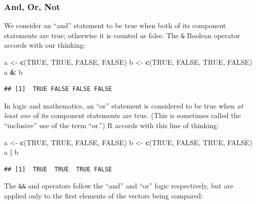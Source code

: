 \documentclass[]{book}
\makeatletter
\newenvironment{Shaded}{\begin{snugshade}}{\end{snugshade}}
\newcommand{\KeywordTok}[1]{\textcolor[rgb]{0.13,0.29,0.53}{\textbf{#1}}}
\newcommand{\StringTok}[1]{\textcolor[rgb]{0.31,0.60,0.02}{#1}}
\newcommand{\OtherTok}[1]{\textcolor[rgb]{0.56,0.35,0.01}{#1}}
\newcommand{\OperatorTok}[1]{\textcolor[rgb]{0.81,0.36,0.00}{\textbf{#1}}}
\newcommand{\NormalTok}[1]{#1}
\newenvironment{kframe}{%
\medskip{}
\setlength{\fboxsep}{.8em}
 \def\at@end@of@kframe{}%
 \ifinner\ifhmode%
  \def\at@end@of@kframe{\end{minipage}}%
  \begin{minipage}{\columnwidth}%
 \fi\fi%
 \def\FrameCommand##1{\hskip\@totalleftmargin \hskip-\fboxsep
 \colorbox{shadecolor}{##1}\hskip-\fboxsep
     \hskip-\linewidth \hskip-\@totalleftmargin \hskip\columnwidth}%
 \MakeFramed {\advance\hsize-\width
   \@totalleftmargin\z@ \linewidth\hsize
   \@setminipage}}%
 {\par\unskip\endMakeFramed%
 \at@end@of@kframe}
\renewenvironment{Shaded}{\begin{kframe}}{\end{kframe}}
\theoremstyle{definition}
\theoremstyle{definition}
\theoremstyle{definition}
\theoremstyle{remark}
\makeatother
\begin{document}
\subsubsection{And, Or, Not}\label{and-or-not}

We consider an ``and'' statement to be true when both of its component
statements are true; otherwise it is counted as false. The \texttt{\&}
Boolean operator accords with our thinking:

\begin{Shaded}
\begin{Highlighting}[]
\NormalTok{a <-}\StringTok{ }\KeywordTok{c}\NormalTok{(}\OtherTok{TRUE}\NormalTok{, }\OtherTok{TRUE}\NormalTok{, }\OtherTok{FALSE}\NormalTok{, }\OtherTok{FALSE}\NormalTok{)}
\NormalTok{b <-}\StringTok{ }\KeywordTok{c}\NormalTok{(}\OtherTok{TRUE}\NormalTok{, }\OtherTok{FALSE}\NormalTok{, }\OtherTok{TRUE}\NormalTok{, }\OtherTok{FALSE}\NormalTok{)}
\NormalTok{a }\OperatorTok{&}\StringTok{ }\NormalTok{b}
\end{Highlighting}
\end{Shaded}

\begin{verbatim}
## [1]  TRUE FALSE FALSE FALSE
\end{verbatim}

In logic and mathematics, an ``or'' statement is considered to be true
when \emph{at least one} of its component statements are true. (This is
sometimes called the ``inclusive'' use of the term ``or.'') R accords
with this line of thinking:

\begin{Shaded}
\begin{Highlighting}[]
\NormalTok{a <-}\StringTok{ }\KeywordTok{c}\NormalTok{(}\OtherTok{TRUE}\NormalTok{, }\OtherTok{TRUE}\NormalTok{, }\OtherTok{FALSE}\NormalTok{, }\OtherTok{FALSE}\NormalTok{)}
\NormalTok{b <-}\StringTok{ }\KeywordTok{c}\NormalTok{(}\OtherTok{TRUE}\NormalTok{, }\OtherTok{FALSE}\NormalTok{, }\OtherTok{TRUE}\NormalTok{, }\OtherTok{FALSE}\NormalTok{)}
\NormalTok{a }\OperatorTok{|}\StringTok{ }\NormalTok{b}
\end{Highlighting}
\end{Shaded}

\begin{verbatim}
## [1]  TRUE  TRUE  TRUE FALSE
\end{verbatim}

The \texttt{\&\&} and \texttt{\textbar{}\textbar{}} operators follow the
``and'' and ``or'' logic respectively, but are applied only to the first
elements of the vectors being compared:
\end{document}
